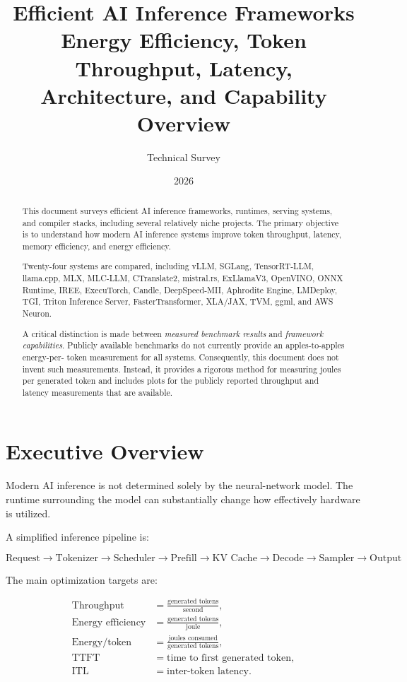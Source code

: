 \documentclass[11pt,a4paper]{article}
\title{
    \textbf{Efficient AI Inference Frameworks}\\[0.4em]
    \large Energy Efficiency, Token Throughput, Latency,
    Architecture, and Capability Overview
}
\author{Technical Survey}
\date{2026}
\begin{document}
\maketitle

\begin{abstract}
This document surveys efficient AI inference frameworks, runtimes,
serving systems, and compiler stacks, including several relatively
niche projects.  The primary objective is to understand how modern
AI inference systems improve token throughput, latency, memory
efficiency, and energy efficiency.

Twenty-four systems are compared, including vLLM, SGLang,
TensorRT-LLM, llama.cpp, MLX, MLC-LLM, CTranslate2, mistral.rs,
ExLlamaV3, OpenVINO, ONNX Runtime, IREE, ExecuTorch, Candle,
DeepSpeed-MII, Aphrodite Engine, LMDeploy, TGI, Triton Inference
Server, FasterTransformer, XLA/JAX, TVM, ggml, and AWS Neuron.

A critical distinction is made between \emph{measured benchmark
results} and \emph{framework capabilities}.  Publicly available
benchmarks do not currently provide an apples-to-apples energy-per-
token measurement for all systems.  Consequently, this document
does not invent such measurements.  Instead, it provides a rigorous
method for measuring joules per generated token and includes plots
for the publicly reported throughput and latency measurements that
are available.
\end{abstract}

\tableofcontents
\newpage

\section{Executive Overview}

Modern AI inference is not determined solely by the neural-network
model.  The runtime surrounding the model can substantially change
how effectively hardware is utilized.

A simplified inference pipeline is:

\[
\boxed{
\text{Request}
\rightarrow
\text{Tokenizer}
\rightarrow
\text{Scheduler}
\rightarrow
\text{Prefill}
\rightarrow
\text{KV Cache}
\rightarrow
\text{Decode}
\rightarrow
\text{Sampler}
\rightarrow
\text{Output}
}
\]

The main optimization targets are:

\begin{align}
\text{Throughput} &=
\frac{\text{generated tokens}}{\text{second}},\\[4pt]
\text{Energy efficiency} &=
\frac{\text{generated tokens}}{\text{joule}},\\[4pt]
\text{Energy/token} &=
\frac{\text{joules consumed}}{\text{generated tokens}},\\[4pt]
\text{TTFT} &=
\text{time to first generated token},\\[4pt]
\text{ITL} &=
\text{inter-token latency}.
\end{align}
\end{document}
